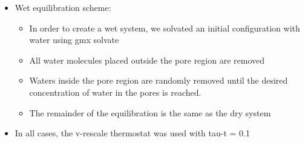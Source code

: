 \documentclass{article}
\begin{document}
\begin{itemize}
\begin{itemize}
      \end{itemize}
      \item Wet equilibration scheme: 
      \begin{itemize}
	  \item In order to create a wet system, we solvated an initial configuration with water using gmx solvate
          \item All water molecules placed outside the pore region are removed 
	  \item Waters inside the pore region are randomly removed until the desired concentration
	  of water in the pores is reached. 
	  \item The remainder of the equilibration is the same as the dry system
      \end{itemize}
      \item In all cases, the v-rescale thermostat was used with tau-t = 0.1 %
  \end{itemize}
\end{document}
